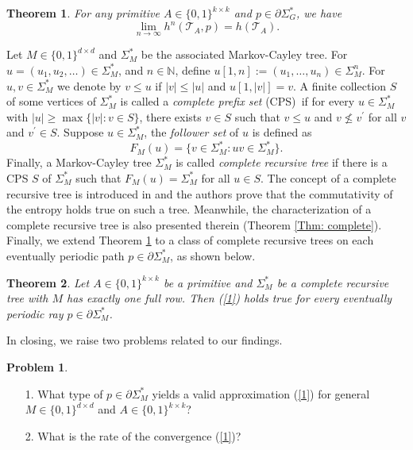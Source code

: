 \documentclass{amsart}
\newtheorem{theorem}{Theorem}[]
\theoremstyle{definition}
\newtheorem{problem}{Problem}
\begin{document}
\begin{theorem}\label{Thm: 1}
For any primitive $A\in \{0,1\}^{k\times k}$ and $p\in \partial
\Sigma _{G}^{\ast }$, we have 
\begin{equation}
\lim_{n\rightarrow \infty }h^{n}(\mathcal{T}_{A},p)=h(\mathcal{T}_{A}). \label{1}
\end{equation}
\end{theorem}
Let $M\in \{0,1\}^{d\times d}$ and $\Sigma _{M}^{\ast }$ be the associated
Markov-Cayley tree. For $u=(u_{1},u_{2},\ldots )\in \Sigma _{M}^{\ast }$,
and $n\in \mathbb{N}$, define $u[1,n]:=(u_{1},\ldots ,u_{n})\in \Sigma
_{M}^{n}$. For $u,v\in \Sigma _{M}^{\ast }$ we denote by $v\leq u$ if $%
\left\vert v\right\vert \leq \left\vert u\right\vert $ and $u[1,\left\vert
v\right\vert ]=v$. A finite collection $S$ of some vertices of $\Sigma
_{M}^{\ast }$ is called a \emph{complete prefix set }(CPS)\emph{\ }if for
every $u\in \Sigma _{M}^{\ast }$ with $\left\vert u\right\vert \geq \max
\{\left\vert v\right\vert :v\in S\}$, there exists $v\in S$ such that $v\leq
u$ and $v\nleq v^{\prime}$ for all $v$ and $v^{\prime }\in S$. Suppose $%
u\in \Sigma _{M}^{\ast }$, the \emph{follower set }of $u$ is defined as  
\[
F_{M}(u)=\{v\in \Sigma _{M}^{\ast }:uv\in \Sigma _{M}^{\ast }\}\text{.}
\]%
Finally, a Markov-Cayley tree $\Sigma _{M}^{\ast }$ is called \emph{complete
recursive tree }if there is a CPS $S$ of $\Sigma _{M}^{\ast }$ such that $%
F_{M}(u)=\Sigma _{M}^{\ast }$ for all $u\in S$. The concept of a complete recursive tree is introduced in \cite{ban2022Commutativity} and the authors prove that the commutativity of the entropy holds true on such a tree. Meanwhile, the characterization of a complete recursive tree is also presented therein (Theorem \ref{Thm: complete}). Finally, we extend Theorem \ref{Thm: 1} to a class of complete recursive trees on each eventually periodic path $p\in \partial \Sigma _{M}^{\ast }$, as shown below.   

\begin{theorem}\label{Thm: 1-2}
Let $A\in \{0,1\}^{k\times k}$ be a primitive and $\Sigma _{M}^{\ast }$ be a
complete recursive tree with $M$ has exactly one full row. Then (\ref{1}) holds true for every eventually
periodic ray $p\in \partial \Sigma _{M}^{\ast }$.
\end{theorem}


In closing, we raise two problems related to our findings.

\begin{problem}
\label{Prob: 1}

\begin{itemize}
 \item[1.] What type of $p\in \partial \Sigma _{M}^{\ast }$ yields a valid
approximation (\ref{1}) for general $M\in \{0,1\}^{d\times d}$ and $A\in
\{0,1\}^{k\times k}$?

\item[2.] What is the rate of the convergence (\ref{1})?   
\end{itemize}
\end{problem}
\end{document}
